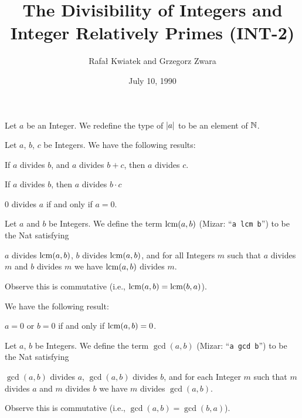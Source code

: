\documentclass{article}
\title{The Divisibility of Integers and Integer Relatively Primes (INT-2)}
\author{Rafa{\l} Kwiatek and Grzegorz Zwara}
\date{July 10, 1990}
\begin{document}
\maketitle

\begin{definition}
Let $a$ be an Integer.
We redefine the type of $\lvert a\rvert$ to be an element of $\mathbb{N}$.
\end{definition}

Let $a$, $b$, $c$ be Integers. We have the following results:
\begin{thm}
\item\label{int2:1} If $a$ divides $b$, and $a$ divides $b+c$,
  then $a$ divides $c$.
\item\label{int2:2} If $a$ divides $b$, then $a$ divides $b\cdot c$
\item\label{int2:3} $0$ divides $a$ if and only if $a=0$.
\end{thm}

\begin{definition}%
Let $a$ and $b$ be Integers.
We define the term $\operatorname{lcm}(a,b)$ (Mizar: ``\verb#a lcm b#'') to be the Nat
satisfying
\begin{defn}
\item $a$ divides $\operatorname{lcm}(a,b)$, $b$ divides $\operatorname{lcm}(a,b)$, and for all
  Integers $m$ such that $a$ divides $m$ and $b$ divides $m$ we have
  $\operatorname{lcm}(a,b)$ divides $m$.
\end{defn}
Observe this is commutative (i.e., $\operatorname{lcm}(a,b)=\operatorname{lcm}(b,a)$).
\end{definition}

We have the following result:
\begin{thm}
\item\label{int2:4} $a=0$ or $b=0$ if and only if $\operatorname{lcm}(a,b)=0$.
\end{thm}

\begin{definition}
Let $a$, $b$ be Integers.
We define the term $\gcd(a,b)$ (Mizar: ``\verb#a gcd b#'') to be the Nat
satisfying
\begin{defn}
\item $\gcd(a,b)$ divides $a$, $\gcd(a,b)$ divides $b$, and for each
  Integer $m$ such that $m$ divides $a$ and $m$ divides $b$ we have $m$
  divides $\gcd(a,b)$.
\end{defn}
Observe this is commutative (i.e., $\gcd(a,b)=\gcd(b,a)$).
\end{definition}
\end{document}
